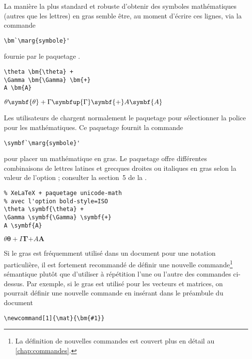 La manière la plus standard et robuste d'obtenir des symboles
mathématiques (autres que les lettres) en gras semble être, au moment
d'écrire ces lignes, via la commande
\begin{lstlisting}
\bm`\marg{symbole}'
\end{lstlisting}
fournie par le paquetage  \citep{bm}.
\begin{demo}
  \begin{texample}[0.6\linewidth]
\begin{lstlisting}
\theta \bm{\theta} +
\Gamma \bm{\Gamma} \bm{+}
A \bm{A}
\end{lstlisting}
    \producing
    $\theta \symbf{\theta} + \Gamma \symbfup{\Gamma} \symbf{+} A
    \symbf{A}$
  \end{texample}
\end{demo}

Les utilisateurs de {\XeLaTeX} chargent normalement le paquetage
 \citep{unicode-math} pour sélectionner la police
pour les mathématiques. Ce paquetage fournit la commande
\begin{lstlisting}
\symbf`\marg{symbole}'
\end{lstlisting}
pour placer un  mathématique en gras. Le paquetage offre
différentes combinaisons de lettres latines et grecques droites ou
italiques en gras selon la valeur de l'option ;
consulter la section~5 de la %
. %
\begin{demo}
  \begin{texample}[0.6\linewidth]
\begin{lstlisting}
% XeLaTeX + paquetage unicode-math
% avec l'option bold-style=ISO
\theta \symbf{\theta} +
\Gamma \symbf{\Gamma} \symbf{+}
A \symbf{A}
\end{lstlisting}
    \producing
    $\theta \symbf{\theta} + \Gamma \symbf{\Gamma} \symbf{+} A
    \symbf{A}$
  \end{texample}
\end{demo}

Si le gras est fréquemment utilisé dans un document pour une notation
particulière, il est fortement recommandé de définir une nouvelle
commande\footnote{%
  La définition de nouvelles commandes est couvert plus en détail au
  \autoref{chap:commandes}.} sémantique plutôt que d'utiliser à
répétition l'une ou l'autre des commandes ci-dessus. Par exemple, si
le gras est utilisé pour les vecteurs et matrices, on pourrait définir
une nouvelle commande \cmdprint{\mat} en insérant dans le préambule du
document
\begin{lstlisting}
\newcommand[1]{\mat}{\bm{#1}}
\end{lstlisting}

